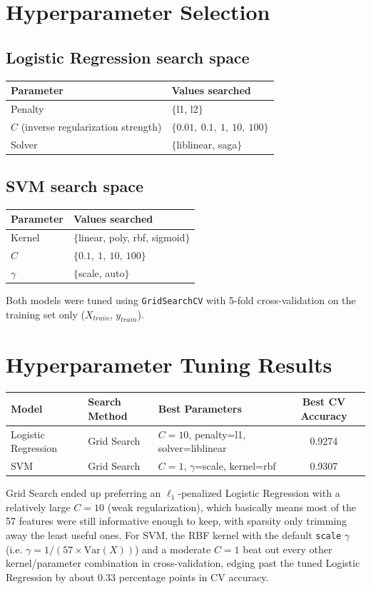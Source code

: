 \documentclass[12pt,a4paper]{article}
\begin{document}
\section{Hyperparameter Selection}
 
\subsection*{Logistic Regression search space}
\begin{tabular}{ll}
\toprule
Parameter & Values searched\\
\midrule
Penalty & $\{$l1, l2$\}$ \\
$C$ (inverse regularization strength) & $\{0.01,\ 0.1,\ 1,\ 10,\ 100\}$ \\
Solver & $\{$liblinear, saga$\}$ \\
\bottomrule
\end{tabular}
 
\subsection*{SVM search space}
\begin{tabular}{ll}
\toprule
Parameter & Values searched\\
\midrule
Kernel & $\{$linear, poly, rbf, sigmoid$\}$ \\
$C$ & $\{0.1,\ 1,\ 10,\ 100\}$ \\
$\gamma$ & $\{$scale, auto$\}$ \\
\bottomrule
\end{tabular}
 
Both models were tuned using \texttt{GridSearchCV} with 5-fold cross-validation on
the training set only ($X_{train}$, $y_{train}$).
 
\section{Hyperparameter Tuning Results}
 
\begin{tabular}{lp{4cm}p{5cm}c}
\toprule
Model & Search Method & Best Parameters & Best CV Accuracy\\
\midrule
Logistic Regression & Grid Search & $C=10$, penalty=l1, solver=liblinear & 0.9274 \\
SVM & Grid Search & $C=1$, $\gamma$=scale, kernel=rbf & 0.9307 \\
\bottomrule
\end{tabular}
 
Grid Search ended up preferring an $\ell_1$-penalized Logistic Regression with a
relatively large $C=10$ (weak regularization), which basically means most of the 57
features were still informative enough to keep, with sparsity only trimming away the
least useful ones. For SVM, the RBF kernel with the default \texttt{scale} $\gamma$
(i.e. $\gamma = 1 / (57 \times \text{Var}(X))$) and a moderate $C=1$ beat out every
other kernel/parameter combination in cross-validation, edging past the tuned
Logistic Regression by about 0.33 percentage points in CV accuracy.
 
\end{document}
